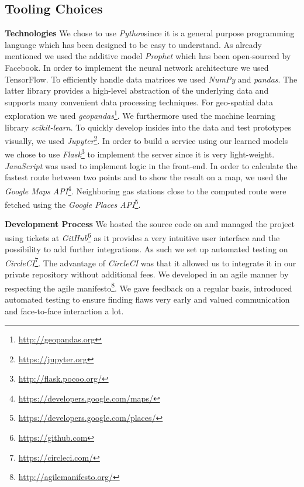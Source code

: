 \documentclass[%
a4paper,
DIV12,
2.5headlines,
bigheadings,
titlepage,
openbib,
]{scrartcl}
\begin{document}
\subsection{Tooling Choices}\label{tooling-choices}
\textbf{Technologies}
We chose to use \textit{Python}since it is a general purpose programming language which has been designed to be easy to understand.
As already mentioned we used the additive model \textit{Prophet} which has been open-sourced by Facebook.
In order to implement the neural network architecture we used TensorFlow.
To efficiently handle data matrices we used \textit{NumPy}\citep{walt2011numpy} and \textit{pandas}\citep{mckinney2010data}.
The latter library provides a high-level abstraction of the underlying data and supports many convenient data processing techniques.
For geo-spatial data exploration we used \textit{geopandas}\footnote{\url{http://geopandas.org}}.
We furthermore used the machine learning library \textit{scikit-learn}.
To quickly develop insides into the data and test prototypes visually, we used \textit{Jupyter}\footnote{\url{https://jupyter.org}}.
In order to build a service using our learned models we chose to use \textit{Flask}\footnote{\url{http://flask.pocoo.org/}} to implement the server since it is very light-weight.
\textit{JavaScript} was used to implement logic in the front-end.
In order to calculate the fastest route between two points and to show the result on a map, we used the \textit{Google Maps API}\footnote{\url{https://developers.google.com/maps/}}.
Neighboring gas stations close to the computed route were fetched using the \textit{Google Places API}\footnote{\url{https://developers.google.com/places/}}.

\textbf{Development Process}
We hosted the source code on and managed the project using tickets at \textit{GitHub}\footnote{\url{https://github.com}} as it provides a very intuitive user interface and the possibility to add further integrations.
As such we set up automated testing on \textit{CircleCI}\footnote{\url{https://circleci.com/}}.
The advantage of \textit{CircleCI} was that it allowed us to integrate it in our private repository without additional fees.
We developed in an agile manner by respecting the agile manifesto\footnote{\url{http://agilemanifesto.org/}}.
We gave feedback on a regular basis, introduced automated testing to ensure finding flaws very early and valued communication and face-to-face interaction a lot.
\end{document}
